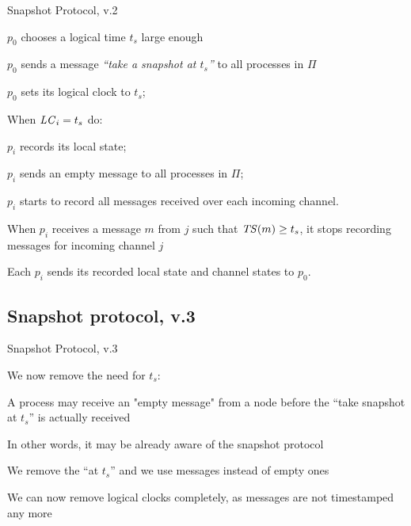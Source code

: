 \begin{frame}{Snapshot Protocol, v.2}
\BEL
\item $p_0$ chooses a logical time $t_s$ large enough
\item $p_0$ sends a message \emph{``take a snapshot at $t_s$''} to all processes in $\Pi$
\item $p_0$ sets its logical clock to $t_s$;
\item When $\mathit{LC}_i=t_s$ do:
  \BE
  \item $p_i$ records its local state;
  \item $p_i$ sends an empty message to all processes in $\Pi$;
  \item $p_i$ starts to record all messages received over each incoming channel.
  \EE
\item When $p_i$ receives a message $m$ from $j$ such that $\mathit{TS}(m) \geq t_s$, it stops recording
  messages for incoming channel $j$
\item Each $p_i$ sends its recorded local state and channel states to $p_0$.
\EEL
\end{frame}

\subsection{Snapshot protocol, v.3}

\begin{frame}{Snapshot Protocol, v.3}

We now remove the need for $t_s$:

\BIL
\item A process may receive an "empty message" from a node before the ``take
snapshot at $t_s$'' is actually received
\item In other words, it may be already aware of the snapshot protocol
\item We remove the ``at $t_s$'' and we use \SNAPSHOT messages instead of
empty ones
\item We can now remove logical clocks completely, as messages are not
timestamped any more
\EIL

\end{frame}

